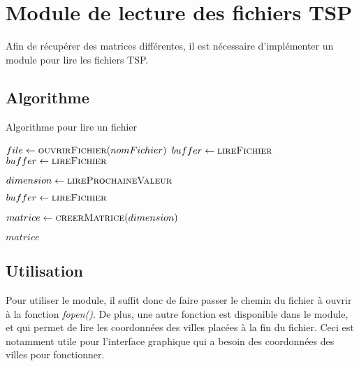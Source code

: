 \chapter{Module de lecture des fichiers TSP}

Afin de récupérer des matrices différentes, il est nécessaire d'implémenter un module pour lire les fichiers TSP. 

\section{Algorithme}

\begin{algorithm}
\caption{Algorithme pour lire un fichier}
\begin{algorithmic}


\State $file \gets \Call{ouvrirFichier}{nomFichier}$
\State $buffer \gets \Call{lireFichier}{}$
	\State $buffer \gets \Call{lireFichier}{}$
\EndWhile

\State $dimension \gets \Call{lireProchaineValeur}{}$

	\State $buffer \gets \Call{lireFichier}{}$
\EndWhile

\State $matrice \gets \Call{creerMatrice}{dimension}$


\EndWhile

\Return $matrice$
\EndFunction
\end{algorithmic}
\end{algorithm}

\section{Utilisation}

Pour utiliser le module, il suffit donc de faire passer le chemin du fichier à ouvrir à la fonction \textit{fopen()}. 
De plus, une autre fonction est disponible dans le module, et qui permet de lire les coordonnées des villes placées à la fin du fichier. Ceci est notamment utile pour l'interface graphique qui a besoin des coordonnées des villes pour fonctionner.


